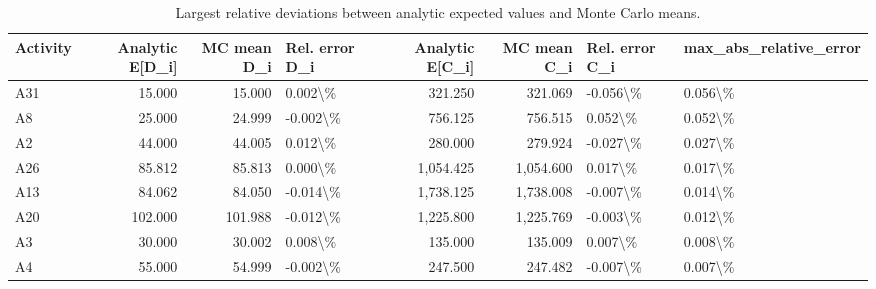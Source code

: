 \begin{table}
\caption{Largest relative deviations between analytic expected values and Monte Carlo means.}
\label{tab:largest-expected-value-errors}
\begin{tabular}{lrrlrrll}
\toprule
Activity & Analytic E[D\_i] & MC mean D\_i & Rel. error D\_i & Analytic E[C\_i] & MC mean C\_i & Rel. error C\_i & max\_abs\_relative\_error \\
\midrule
A31 & 15.000 & 15.000 & 0.002\textbackslash \% & 321.250 & 321.069 & -0.056\textbackslash \% & 0.056\textbackslash \% \\
A8 & 25.000 & 24.999 & -0.002\textbackslash \% & 756.125 & 756.515 & 0.052\textbackslash \% & 0.052\textbackslash \% \\
A2 & 44.000 & 44.005 & 0.012\textbackslash \% & 280.000 & 279.924 & -0.027\textbackslash \% & 0.027\textbackslash \% \\
A26 & 85.812 & 85.813 & 0.000\textbackslash \% & 1,054.425 & 1,054.600 & 0.017\textbackslash \% & 0.017\textbackslash \% \\
A13 & 84.062 & 84.050 & -0.014\textbackslash \% & 1,738.125 & 1,738.008 & -0.007\textbackslash \% & 0.014\textbackslash \% \\
A20 & 102.000 & 101.988 & -0.012\textbackslash \% & 1,225.800 & 1,225.769 & -0.003\textbackslash \% & 0.012\textbackslash \% \\
A3 & 30.000 & 30.002 & 0.008\textbackslash \% & 135.000 & 135.009 & 0.007\textbackslash \% & 0.008\textbackslash \% \\
A4 & 55.000 & 54.999 & -0.002\textbackslash \% & 247.500 & 247.482 & -0.007\textbackslash \% & 0.007\textbackslash \% \\
\bottomrule
\end{tabular}
\end{table}
